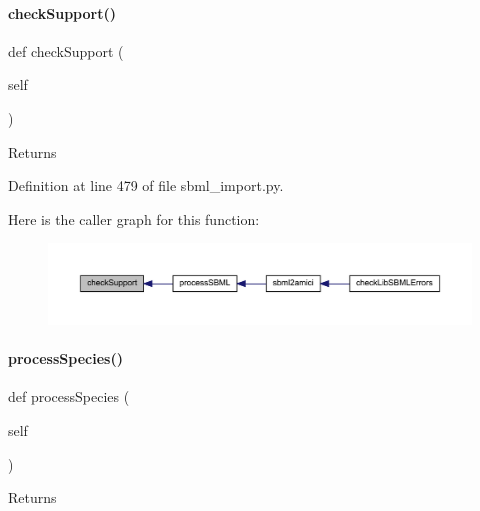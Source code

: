 \paragraph{\texorpdfstring{check\+Support()}{checkSupport()}}
{\footnotesize\ttfamily def check\+Support (\begin{DoxyParamCaption}\item[{}]{self }\end{DoxyParamCaption})}

\begin{DoxyReturn}{Returns}

\end{DoxyReturn}


Definition at line 479 of file sbml\+\_\+import.\+py.

Here is the caller graph for this function\+:
\nopagebreak
\begin{figure}[H]
\begin{center}
\leavevmode
\includegraphics[width=350pt]{classamici_1_1sbml__import_1_1_sbml_importer_ae9585f937c02f0618abeb06dd48bcd54_icgraph}
\end{center}
\end{figure}
\mbox{\label{classamici_1_1sbml__import_1_1_sbml_importer_a4912a89bf86ec8e0c1d9758b8090e327}} 
\paragraph{\texorpdfstring{process\+Species()}{processSpecies()}}
{\footnotesize\ttfamily def process\+Species (\begin{DoxyParamCaption}\item[{}]{self }\end{DoxyParamCaption})}

\begin{DoxyReturn}{Returns}

\end{DoxyReturn}


